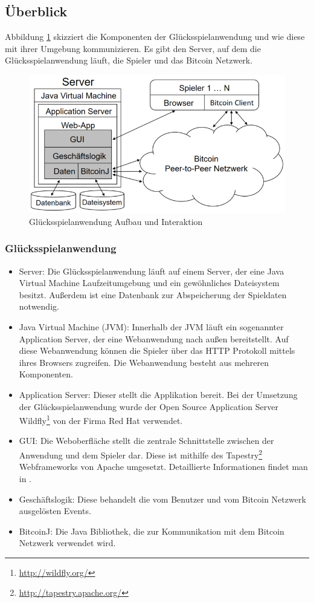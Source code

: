 \subsection{Überblick}

Abbildung \ref{fig:anwendung_aufbau} skizziert die Komponenten der Glücksspielanwendung und wie diese mit ihrer Umgebung kommunizieren. Es gibt den Server, auf dem die Glücksspielanwendung läuft, die Spieler und das Bitcoin Netzwerk.

\begin{figure}[H]
\centering
\includegraphics[width=1\linewidth]{Figures/umsetzung_btc/anwendung_aufbau}
\decoRule
\caption{Glücksspielanwendung Aufbau und Interaktion}
\label{fig:anwendung_aufbau}
\end{figure}

\subsubsection{Glücksspielanwendung}
\begin{itemize}
\item Server: Die Glücksspielanwendung läuft auf einem Server, der eine Java Virtual Machine Laufzeitumgebung und ein gewöhnliches Dateisystem besitzt. Außerdem ist eine Datenbank zur Abspeicherung der Spieldaten notwendig.
\item Java Virtual Machine (JVM): Innerhalb der JVM läuft ein sogenannter Application Server, der eine Webanwendung nach außen bereitstellt. Auf diese Webanwendung können die Spieler über das HTTP Protokoll mittels ihres Browsers zugreifen. Die Webanwendung besteht aus mehreren Komponenten.
\item Application Server: Dieser stellt die Applikation bereit. Bei der Umsetzung der Glücksspielanwendung wurde der Open Source Application Server Wildfly\footnote{\url{http://wildfly.org/}} von der Firma Red Hat verwendet.
\item GUI: Die Weboberfläche stellt die zentrale Schnittstelle zwischen der Anwendung und dem Spieler dar. Diese ist mithilfe des Tapestry\footnote{\url{http://tapestry.apache.org/}} Webframeworks von Apache umgesetzt. Detaillierte Informationen findet man in \cite{tapestry}.
\item Geschäftslogik: Diese behandelt die vom Benutzer und vom Bitcoin Netzwerk ausgelösten Events.
\item BitcoinJ: Die Java Bibliothek, die zur Kommunikation mit dem Bitcoin Netzwerk verwendet wird.
\end{itemize}

